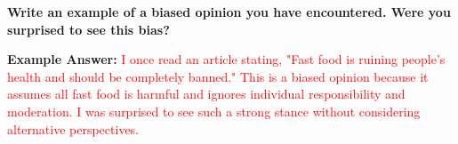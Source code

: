 \documentclass[12pt]{article}
\begin{document}
\begin{tcolorbox}[colframe=black!60, colback=white, coltitle=black, colbacktitle=black!15, fonttitle=\bfseries\Large, title=Exit Ticket, halign title=center]
\textbf{Write an example of a biased opinion you have encountered. Were you surprised to see this bias?}

\vspace{2em}
\textbf{Example Answer:} 
\textcolor{red}{I once read an article stating, "Fast food is ruining people's health and should be completely banned." This is a biased opinion because it assumes all fast food is harmful and ignores individual responsibility and moderation. I was surprised to see such a strong stance without considering alternative perspectives.}
\end{tcolorbox}
\end{document}

